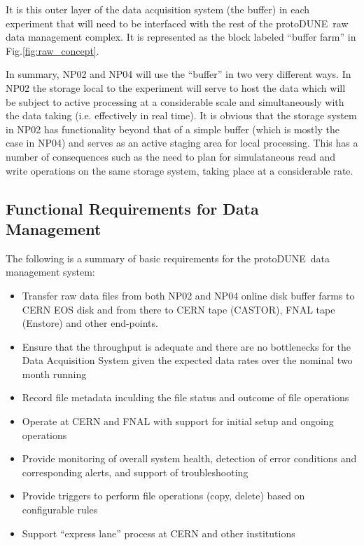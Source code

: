 \documentclass[pdftex,12pt,letter]{article}
\newcommand{\pd}{protoDUNE\ }
\begin{document}
\noindent
It is this outer layer of the data acquisition system (the buffer) in each experiment that will need to be interfaced with
the rest of the \pd raw data management complex.  It is represented as the block labeled ``buffer farm'' in Fig.\ref{fig:raw_concept}.

In summary, NP02 and NP04 will use the ``buffer'' in two very different ways.  In NP02
the storage local to the experiment will serve to host the data which will be subject to active processing at a considerable scale
and simultaneously with the data taking (i.e. effectively in real time).
It is obvious that the storage system in NP02 has functionality beyond that of a simple buffer (which is mostly the case in NP04)
and serves as an active staging area for local processing. This has a number of consequences such as the need to plan
for simulataneous read and write operations on the same storage system, taking place at a considerable rate.


\subsection{Functional Requirements for Data Management}
\label{sec:func_reqs}
The following is a summary of basic requirements for the \pd data management system:
\begin{itemize}

\item Transfer raw data files from both NP02 and NP04 online disk buffer farms
to CERN EOS disk and from there to CERN tape (CASTOR), FNAL tape (Enstore) and other end-points.

\item Ensure that the throughput is adequate and there are no bottlenecks for the Data Acquisition System
given the expected data rates over the nominal two month running%

\item Record file metadata inculding the file status and outcome of file operations

\item Operate at CERN and FNAL with support for initial setup and ongoing operations

\item Provide monitoring of overall system health, detection of error conditions and corresponding alerts, and support of troubleshooting

\item Provide triggers to perform file operations (copy, delete) based on configurable rules

\item Support ``express lane'' process at CERN and other institutions

\end{itemize}
\end{document}
